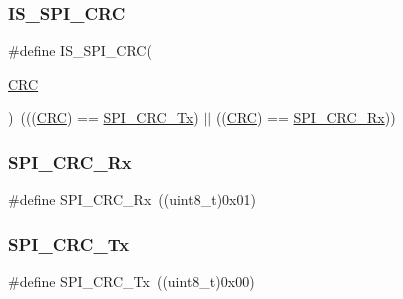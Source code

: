\subsubsection{\texorpdfstring{IS\_SPI\_CRC}{IS\_SPI\_CRC}}
{\footnotesize\ttfamily \#define I\+S\+\_\+\+S\+P\+I\+\_\+\+C\+RC(\begin{DoxyParamCaption}\item[{}]{\mbox{\hyperlink{group___peripheral__declaration_ga4381bb54c2dbc34500521165aa7b89b1}{C\+RC}} }\end{DoxyParamCaption})~(((\mbox{\hyperlink{group___peripheral__declaration_ga4381bb54c2dbc34500521165aa7b89b1}{C\+RC}}) == \mbox{\hyperlink{group___s_p_i___c_r_c___transmit___receive_ga7b5cd97c9323e491b628fd3a7be9e133}{S\+P\+I\+\_\+\+C\+R\+C\+\_\+\+Tx}}) $\vert$$\vert$ ((\mbox{\hyperlink{group___peripheral__declaration_ga4381bb54c2dbc34500521165aa7b89b1}{C\+RC}}) == \mbox{\hyperlink{group___s_p_i___c_r_c___transmit___receive_gaf68380273616efbbc2dc9a420f1c641b}{S\+P\+I\+\_\+\+C\+R\+C\+\_\+\+Rx}}))}

\mbox{\label{group___s_p_i___c_r_c___transmit___receive_gaf68380273616efbbc2dc9a420f1c641b}} 
\subsubsection{\texorpdfstring{SPI\_CRC\_Rx}{SPI\_CRC\_Rx}}
{\footnotesize\ttfamily \#define S\+P\+I\+\_\+\+C\+R\+C\+\_\+\+Rx~((uint8\+\_\+t)0x01)}

\mbox{\label{group___s_p_i___c_r_c___transmit___receive_ga7b5cd97c9323e491b628fd3a7be9e133}} 
\subsubsection{\texorpdfstring{SPI\_CRC\_Tx}{SPI\_CRC\_Tx}}
{\footnotesize\ttfamily \#define S\+P\+I\+\_\+\+C\+R\+C\+\_\+\+Tx~((uint8\+\_\+t)0x00)}

